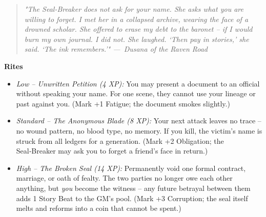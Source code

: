 \documentclass[12pt]{book}
\newcommand{\dusana}[1]{%
    \begin{quote}\itshape #1 ---~Dusana of the Raven Road\end{quote}}
\begin{document}
\vspace{0.5em}
\dusana{"The Seal‑Breaker does not ask for your name. She asks what you are willing to forget. I met her in a collapsed archive, wearing the face of a drowned scholar. She offered to erase my debt to the baronet – if I would burn my own journal. I did not. She laughed. ‘Then pay in stories,’ she said. ‘The ink remembers.’"}

\begin{infobox}
\textbf{Rites}
\begin{itemize}
    \item \textit{Low – Unwritten Petition (4 XP):} You may present a document to an official without speaking your name. For one scene, they cannot use your lineage or past against you. (Mark +1 Fatigue; the document smokes slightly.)
    \item \textit{Standard – The Anonymous Blade (8 XP):} Your next attack leaves no trace – no wound pattern, no blood type, no memory. If you kill, the victim’s name is struck from all ledgers for a generation. (Mark +2 Obligation; the Seal‑Breaker may ask you to forget a friend’s face in return.)
    \item \textit{High – The Broken Seal (14 XP):} Permanently void one formal contract, marriage, or oath of fealty. The two parties no longer owe each other anything, but \textit{you} become the witness – any future betrayal between them adds 1 Story Beat to the GM’s pool. (Mark +3 Corruption; the seal itself melts and reforms into a coin that cannot be spent.)
\end{itemize}
\end{infobox}
\end{document}
